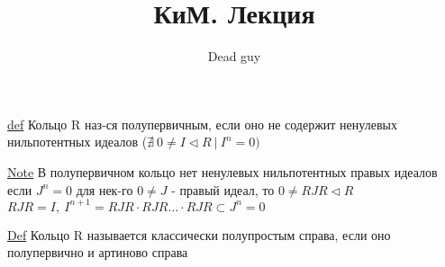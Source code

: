 \documentclass[a4paper]{article}
\begin{document}
\title{КиМ. Лекция}
\author{Dead guy}
\maketitle

\begin{tcolorbox}
\underline{def} Кольцо R наз-ся полупервичным, если оно не содержит ненулевых
нильпотентных идеалов ($ \nexists \ 0 \neq I \lhd R \ | \ I^{n} = 0) $ 
\end{tcolorbox}

\underline{Note} В полупервичном кольцо нет ненулевых нильпотентных правых идеалов\\
если $ J^{n} = 0 $ для нек-го $ 0 \neq J $ - правый идеал, то $ 0 \neq RJR \lhd R $ \\
$ RJR = I, \ I^{n+1} = RJR \cdot RJR \dots \cdot RJR \subset J^{n} = 0 $ 

\begin{tcolorbox}
\underline{Def} Кольцо R называется классически полупростым справа, если оно полупервично
и артиново справа
\end{tcolorbox}
\end{document}
